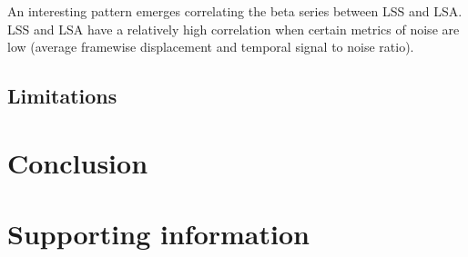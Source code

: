 \documentclass[10pt,letterpaper]{article}
\begin{document}
An interesting pattern emerges correlating the beta series between LSS and LSA.
LSS and LSA have a relatively high correlation when certain metrics of noise
are low (average framewise displacement and temporal signal to noise ratio).



\subsection{Limitations}
\section*{Conclusion}



\section*{Supporting information}


\end{document}
